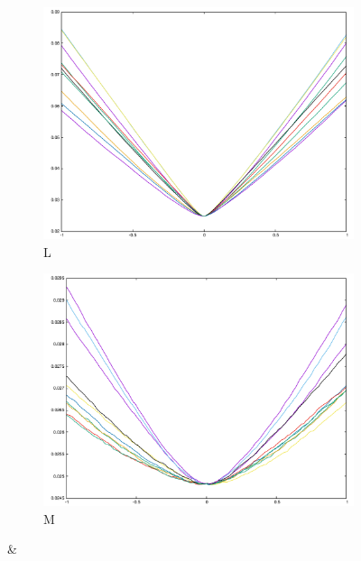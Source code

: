 {\begin{figure}[H]
\begin{subfigure}{.33\textwidth}
\end{subfigure}\\
\begin{subfigure}{.33\textwidth}
	\includegraphics[width=\linewidth]{fig/ajherr/t2/L_mae.pdf}
	\caption{L}
\end{subfigure}%
\begin{subfigure}{.33\textwidth}
	\includegraphics[width=\linewidth]{fig/ajherr/t2/M_mae.pdf}
	\caption{M}
\end{subfigure}&
\begin{subfigure}{.33\textwidth}

\end{subfigure}
\end{figure}}
